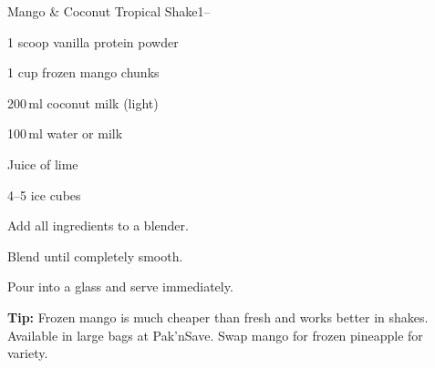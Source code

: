 \begin{recipebox}{Mango \& Coconut Tropical Shake}{1}{--}
\begin{ingredients}
  \item 1 scoop vanilla protein powder
  \item 1 cup frozen mango chunks
  \item 200\,ml coconut milk (light)
  \item 100\,ml water or milk
  \item Juice of \textonehalf{} lime
  \item 4--5 ice cubes
\end{ingredients}

\begin{method}
  \item Add all ingredients to a blender.
  \item Blend until completely smooth.
  \item Pour into a glass and serve immediately.
\end{method}

\begin{notelist}
  \item \textbf{Tip:} Frozen mango is much cheaper than fresh and works better in shakes. Available in large bags at Pak'nSave. Swap mango for frozen pineapple for variety.
\end{notelist}
\end{recipebox}

